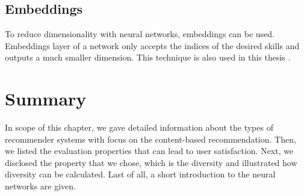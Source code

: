 \subsection{Embeddings}

To reduce dimensionality with neural networks, embeddings can be used. Embeddings layer of a network only accepts the indices of the desired skills and outputs a much smaller dimension. This technique is also used in this thesis \cite{gal2016theoretically}.





\section{Summary}


In scope of this chapter, we gave detailed information about the types of recommender systems with focus on the content-based recommendation. Then, we listed the evaluation properties that can lead to user satisfaction. Next, we disclosed the property that we chose, which is the diversity and illustrated how diversity can be calculated. Last of all, a short introduction to the neural networks are given.

